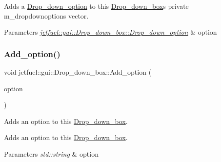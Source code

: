 Adds a \hyperlink{structjetfuel_1_1gui_1_1Drop__down__box_1_1Drop__down__option}{Drop\+\_\+down\+\_\+option} to this \hyperlink{classjetfuel_1_1gui_1_1Drop__down__box}{Drop\+\_\+down\+\_\+box}\textquotesingle{}s private m\+\_\+dropdownoptions vector.


\begin{DoxyParams}{Parameters}
{\em \hyperlink{structjetfuel_1_1gui_1_1Drop__down__box_1_1Drop__down__option}{jetfuel\+::gui\+::\+Drop\+\_\+down\+\_\+box\+::\+Drop\+\_\+down\+\_\+option}} & option \\
\hline
\end{DoxyParams}
\mbox{\label{classjetfuel_1_1gui_1_1Drop__down__box_a2dd70d6c3982232965ecc9b7079b6144}} 
\subsubsection{\texorpdfstring{Add\+\_\+option()}{Add\_option()}}
{\footnotesize\ttfamily void jetfuel\+::gui\+::\+Drop\+\_\+down\+\_\+box\+::\+Add\+\_\+option (\begin{DoxyParamCaption}\item[{const std\+::string}]{option }\end{DoxyParamCaption})}



Adds an option to this \hyperlink{classjetfuel_1_1gui_1_1Drop__down__box}{Drop\+\_\+down\+\_\+box}. 

Adds an option to this \hyperlink{classjetfuel_1_1gui_1_1Drop__down__box}{Drop\+\_\+down\+\_\+box}.


\begin{DoxyParams}{Parameters}
{\em std\+::string} & option \\
\hline
\end{DoxyParams}
\mbox{\label{classjetfuel_1_1gui_1_1Drop__down__box_a5ed3ca41e8d6147e3af3afc94c8b8f1a}} 
